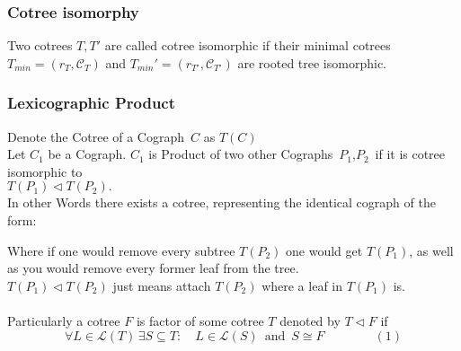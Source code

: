 \documentclass[a4paper,12pt]{article}
\theoremstyle{definition}
\begin{document}
	\subsubsection{Cotree isomorphy}
	Two cotrees $T,T'$ are called cotree isomorphic if their minimal cotrees $T_{min}=(r_T,\mathcal{C}_T)$ and $T_{min}'=(r_{T'},\mathcal{C}_{T'})$ are rooted tree isomorphic.
	\subsubsection{Lexicographic Product}
	Denote the Cotree of a Cograph $\,C$ as $T(C)$\\
	Let $C_1$ be a Cograph. $C_1$ is Product of two other Cographs $\,P_1$,$P_2\,$ if  it is cotree isomorphic to \\$T(P_1)\vartriangleleft T(P_2).$\\
	In other Words there exists a cotree, representing the identical cograph of the form:
		\begin{center}
	\end{center}
	Where if one would remove every subtree $T(P_2)$ one would get $T(P_1)$, as well as you would remove every former leaf from the tree.\\
	$T(P_1)\vartriangleleft T(P_2)$ just means attach $T(P_2)$ where a leaf in $T(P_1)$ is.\\\\
	Particularly a cotree $F$ is factor of some cotree $T$ denoted by $T\vartriangleleft F$ if
	\[\forall L\in \mathcal{L}(T)\,\exists S \subseteq T:\quad L\in\mathcal{L}(S)\,\text{ and }\, S\cong F\qquad\qquad (1)\] 
\end{document}
